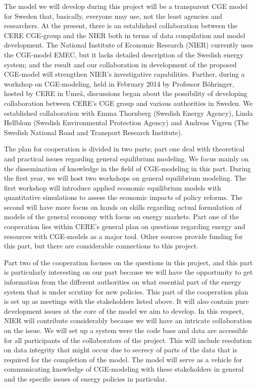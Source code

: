 The model we will develop during this project will be a transparent CGE model for Sweden that, basically, everyone may use,  not the least agencies and researchers. At the present, there is an established collaboration between the CERE CGE-group and the NIER both in terms of data compilation and model development. The National Institute of Economic Research (NIER) currently uses the CGE-model EMEC, but it lacks detailed description of the Swedish energy system; and the result and our collaboration in development of the proposed CGE-model will strengthen NIER's investigative capabilities. Further, during a workshop on CGE-modeling, held in February 2014 by Professor Böhringer, hosted by CERE in Umeå, discussions began about the possibility of developing collaboration between CERE's CGE group and various authorities in Sweden. We established collaboration with Emma Thornberg (Swedish Energy Agency), Linda Hellblom (Swedish Environmental Protection Agency) and Andreas Vigren (The Swedish National Road and Transport Research Institute).

The plan for cooperation is divided in two parts; part one deal with theoretical and practical issues regarding general equilibrium modeling. We focus mainly on the dissemination of knowledge in the field of CGE-modeling in this part. During the first year, we will host two workshops on general equilibrium modeling. The first workshop will introduce applied economic equilibrium models with quantitative simulations to assess the economic impacts of policy reforms. The second will have more focus on hands on skills regarding actual formulation of models of the general economy with focus on energy markets. Part one of the cooperation lies within CERE's general plan on questions regarding energy and resources with CGE-models as a major tool. Other sources provide funding for this part, but there are considerable connections to this project.

Part two of the cooperation focuses on the questions in this project, and this part is particularly interesting on our part because we will have the opportunity to get information from the different authorities on what essential part of the energy system that is under scrutiny for new policies. This part of the cooperation plan is set up as meetings with the stakeholders listed above. It will also contain pure development issues at the core of the model we aim to develop. In this respect, NIER will contribute considerably because we will have an intricate collaboration on the issue. We will set up a system were the code base and data are accessible for all participants of the collaborators of the project. This will include resolution on data integrity that might occur due to secrecy of parts of the data that is required for the completion of the model. The model will serve as a vehicle for communicating knowledge of CGE-modeling with these stakeholders in general and the specific issues of energy policies in particular.


